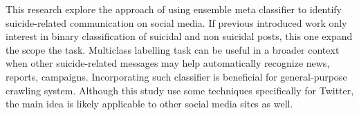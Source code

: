 This research explore the approach of using ensemble meta classifier to identify suicide-related communication on social media. If previous introduced work only interest in binary classification of suicidal and non suicidal posts, this one expand the scope the task. Multiclass labelling task can be useful in a broader context when other suicide-related messages may help automatically recognize news, reports, campaigns. Incorporating such classifier is beneficial for general-purpose crawling system. Although this study use some techniques specifically for Twitter, the main idea is likely applicable to other social media sites as well. 

  

